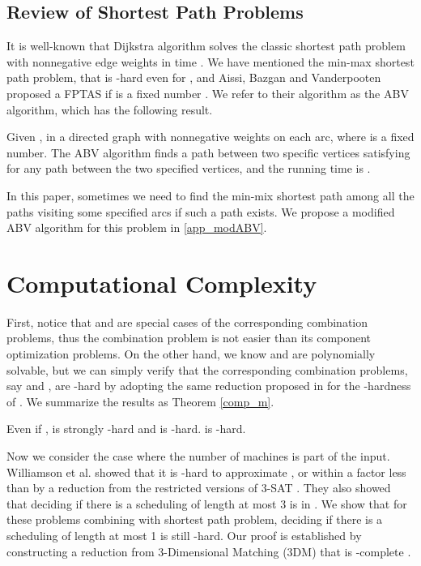 \documentclass{llncs}
\numberwithin{subcase}{case}
\begin{document}
\subsection{Review of Shortest Path Problems}\label{sec_sp}
It is well-known that Dijkstra algorithm solves the classic shortest path problem with nonnegative edge weights in  time \cite{DIJ59}.
We have mentioned the min-max shortest path problem, that is -hard even for , and Aissi, Bazgan and Vanderpooten proposed a FPTAS if  is a fixed number \cite{ABV06}. We refer to their algorithm as the ABV algorithm, which has the following result.

\begin{theorem}\label{th_minmax}
Given , in a directed graph with  nonnegative weights on each arc, where  is a fixed number. The ABV algorithm finds a path  between two specific vertices satisfying 
for any path  between the two specified vertices, and the running time is .
\end{theorem}

In this paper, sometimes we need to find the min-mix shortest path among all the paths visiting some specified arcs if such a path exists. We propose a modified ABV algorithm for this problem in \ref{app_modABV}.

\section{Computational Complexity}\label{sec_com}
First, notice that  and  are special cases of the corresponding combination problems, thus the combination problem is not easier than its component optimization problems. On the other hand, we know  and  are polynomially solvable, but we can simply verify that the corresponding combination problems, say  and , are -hard by adopting the same reduction proposed in \cite{NW13} for the -hardness of . We summarize the results as Theorem \ref{comp_m}.

\begin{theorem}
Even if ,  is strongly -hard and  is -hard.  is -hard. \label{comp_m}
\end{theorem}

Now we consider the case where the number of machines  is part of the input. Williamson et al. showed that it is -hard to approximate ,  or  within a factor less than  by a reduction from the restricted versions of 3-SAT \cite{Williamson97}. They also showed that deciding if there is a scheduling of length at most 3 is in .
We show that for these problems combining with shortest path problem, deciding if there is a scheduling of length at most 1 is still -hard. Our proof is established by constructing a reduction from 3-Dimensional Matching (3DM) that is -complete \cite{GJ79}.
\end{document}
